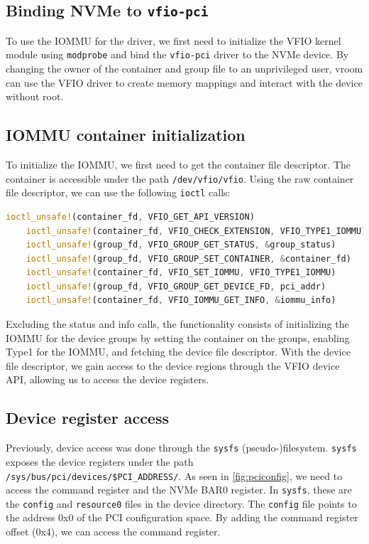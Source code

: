 \subsection{Binding NVMe to \texttt{vfio-pci}}\label{sec:bindvfiopci}
To use the IOMMU for the driver, we first need to initialize the VFIO kernel module using \texttt{modprobe} and bind the \texttt{vfio-pci} driver to the NVMe device. By changing the owner of the container and group file to an unprivileged user, vroom can use the VFIO driver to create memory mappings and interact with the device without root.

\subsection{IOMMU container initialization}\label{sec:iommuinit}
To initialize the IOMMU, we first need to get the container file descriptor. The container is accessible under the path \texttt{/dev/vfio/vfio}. Using the raw container file descriptor, we can use the following \texttt{ioctl} calls:

\begin{lstlisting}[language=Rust, caption={\texttt{ioctl} calls needed for VFIO container initialization}, label=lst:containerioctls]
    ioctl_unsafe!(container_fd, VFIO_GET_API_VERSION)
    ioctl_unsafe!(container_fd, VFIO_CHECK_EXTENSION, VFIO_TYPE1_IOMMU)
    ioctl_unsafe!(group_fd, VFIO_GROUP_GET_STATUS, &group_status)
    ioctl_unsafe!(group_fd, VFIO_GROUP_SET_CONTAINER, &container_fd)
    ioctl_unsafe!(container_fd, VFIO_SET_IOMMU, VFIO_TYPE1_IOMMU)
    ioctl_unsafe!(group_fd, VFIO_GROUP_GET_DEVICE_FD, pci_addr)
    ioctl_unsafe!(container_fd, VFIO_IOMMU_GET_INFO, &iommu_info)   
\end{lstlisting}

Excluding the status and info calls, the functionality consists of initializing the IOMMU for the device groups by setting the container on the groups, enabling Type1 for the IOMMU, and fetching the device file descriptor. With the device file descriptor, we gain access to the device regions through the VFIO device API, allowing us to access the device registers.

\subsection{Device register access}\label{sec:pcieconfig}
Previously, device access was done through the \texttt{sysfs} (pseudo-)filesystem. \texttt{sysfs} exposes the device registers under the path \texttt{/sys/bus/pci/devices/\$PCI\_ADDRESS/}. As seen in \autoref{fig:pciconfig}, we need to access the command register and the NVMe BAR0 register. In \texttt{sysfs}, these are the \texttt{config} and \texttt{resource0} files in the device directory. The \texttt{config} file points to the address 0x0 of the PCI configuration space. By adding the command register offset (0x4), we can access the command register.


